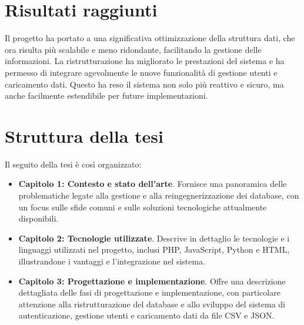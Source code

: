 \section*{Risultati raggiunti}
Il progetto ha portato a una significativa ottimizzazione della struttura dati, che ora risulta più scalabile e meno ridondante, facilitando la gestione delle informazioni. La ristrutturazione ha migliorato le prestazioni del sistema e ha permesso di integrare agevolmente le nuove funzionalità di gestione utenti e caricamento dati. Questo ha reso il sistema non solo più reattivo e sicuro, ma anche facilmente estendibile per future implementazioni.

\section*{Struttura della tesi}
Il seguito della tesi è così organizzato:
\begin{itemize}
    \item \textbf{Capitolo 1: Contesto e stato dell'arte}. Fornisce una panoramica delle problematiche legate alla gestione e alla reingegnerizzazione dei database, con un focus sulle sfide comuni e sulle soluzioni tecnologiche attualmente disponibili.
    \item \textbf{Capitolo 2: Tecnologie utilizzate}. Descrive in dettaglio le tecnologie e i linguaggi utilizzati nel progetto, inclusi PHP, JavaScript, Python e HTML, illustrandone i vantaggi e l’integrazione nel sistema.
    \item \textbf{Capitolo 3: Progettazione e implementazione}. Offre una descrizione dettagliata delle fasi di progettazione e implementazione, con particolare attenzione alla ristrutturazione del database e allo sviluppo del sistema di autenticazione, gestione utenti e caricamento dati da file CSV e JSON.
\end{itemize}
